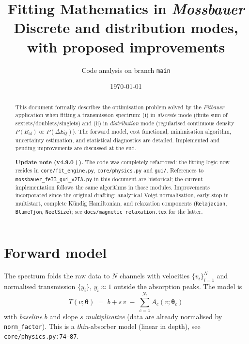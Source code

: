 \documentclass[11pt,a4paper]{article}
\title{\textbf{Fitting Mathematics in \emph{Mossbauer}}\\[2pt]
\large Discrete and distribution modes, with proposed improvements}
\author{Code analysis on branch \texttt{main}}
\date{\today}
\newcommand{\BHF}{B_{\mathrm{hf}}}
\newcommand{\dEQ}{\Delta E_{Q}}
\newcommand{\code}[1]{\texttt{\small #1}}
\newcommand{\file}[1]{\textcolor{black!70}{\texttt{\small #1}}}
\begin{document}
\maketitle

\begin{abstract}\noindent
This document formally describes the optimisation problem solved by the \emph{Fitbauer} application when fitting a transmission spectrum: (i) in \emph{discrete} mode (finite sum of sextets/doublets/singlets) and (ii) in \emph{distribution} mode (regularised continuous density $P(\BHF)$ or $P(\dEQ)$). The forward model, cost functional, minimisation algorithm, uncertainty estimation, and statistical diagnostics are detailed. Implemented and pending improvements are discussed at the end.

\medskip\noindent\textbf{Update note (v4.9.0+).}
The code was completely refactored: the fitting logic now resides in
\file{core/fit\_engine.py}, \file{core/physics.py} and \file{gui/}. References
to \file{mossbauer\_fe33\_gui\_v2IA.py} in this document are historical; the
current implementation follows the same algorithms in those modules. Improvements
incorporated since the original drafting: analytical Voigt normalisation,
early-stop in multistart, complete Kündig Hamiltonian, and relaxation components
(\code{Relajacion}, \code{BlumeTjon}, \code{NeelSize}); see
\file{docs/magnetic\_relaxation.tex} for the latter.
\end{abstract}

\tableofcontents
\bigskip

\section{Forward model}\label{sec:fwd}

The spectrum folds the raw data to $N$ channels with velocities $\{v_i\}_{i=1}^{N}$ and normalised transmission $\{y_i\}$, $y_i \approx 1$ outside the absorption peaks. The model is
\begin{equation}
  \boxed{\;
  T(v;\bm\theta) \;=\; b + s\,v \;-\; \sum_{c=1}^{N_c} A_c(v;\bm\theta_c)
  \;}
  \label{eq:Tmodel}
\end{equation}
with \emph{baseline} $b$ and slope $s$ \emph{multiplicative} (data are already normalised by \code{norm\_factor}). This is a \emph{thin}-absorber model (linear in depth), see \file{core/physics.py:74--87}.
\end{document}

